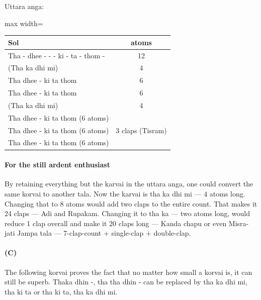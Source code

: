Uttara anga:

\begin{center}
\begin{adjustbox}{max width=\textwidth}
\begin{tabular}{l c}
\toprule
Sol & atoms\\
\midrule
Tha - dhee - - - ki - ta - thom - & 12\\
(Tha ka dhi mi)                   & 4\\
Tha dhee - ki ta thom             & 6\\
Tha dhee - ki ta thom             & 6\\
(Tha ka dhi mi)                   & 4\\
\midrule
Tha dhee - ki ta thom (6 atoms) & \multirow{3}{*}{3 claps (Tisram)}\\
Tha dhee - ki ta thom (6 atoms) & \\
Tha dhee - ki ta thom (6 atoms) & \\
\bottomrule
\end{tabular}
\end{adjustbox}
\end{center}

\paragraph{For the still ardent enthusiast}
By retaining everything but the karvai in the uttara anga, one could convert the same
korvai to another tala. Now the karvai is tha ka dhi mi --- 4 atoms long. Changing that
to 8 atoms would add two claps to the entire count. That makes it 24 claps --- Adi and
Rupakam. Changing it to tha ka --- two atoms long, would reduce 1 clap overall and make
it 20 claps long --- Kanda chapu or even Misra-jati Jampa tala --- 7-clap-count +
single-clap + double-clap.

\paragraph{(C)}
The following korvai proves the fact that no matter how small a korvai is, it can still
be superb. Thaka dhin -, tha tha dhin - can be replaced by tha ka dhi mi, tha ki ta or
tha ki ta, tha ka dhi mi.


